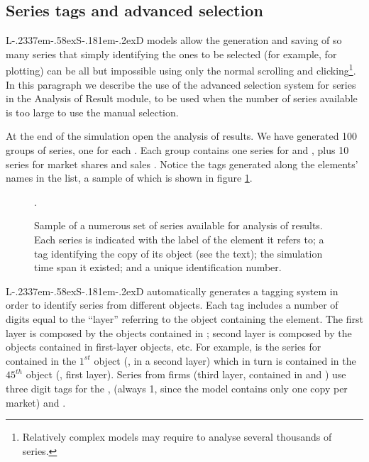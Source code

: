 \documentclass [11pt,a4paper] {book}
\def\LsD{{L\kern-.2337em\lower-.58ex\hbox{S}\kern-.181em\lower-.2ex\hbox{D}}\xspace}
\begin{document}
\subsection{Series tags and advanced selection}

\LsD models allow the generation and saving of so many series that simply identifying the ones to be selected (for example, for plotting) can be all but impossible using only the normal scrolling and clicking\footnote{Relatively complex models may require to analyse several thousands of series.}. In this paragraph we describe the use of the advanced selection system for series in the Analysis of Result module, to be used when the number of series available is too large to use the manual selection.

At the end of the simulation open the analysis of results. We have generated 100 groups of series, one for each . Each group contains one series for  and , plus 10 series for market shares  and sales . Notice the tags generated along the elements' names in the  list, a sample of which is shown in figure \ref{fig:tags}.

\begin{figure}[ht]
  \centering
  \caption{\small Sample of a numerous set of series available for analysis of results. Each series is indicated with the label of the element it refers to; a tag identifying the copy of its object (see the text); the simulation time span it existed; and a unique identification number.}.
   \label{fig:tags}
\end{figure}

\LsD automatically generates a tagging system in order to identify series from different objects. Each tag includes a number of digits equal to the ``layer'' referring to the object containing the element. The first layer is composed by the objects contained in ; second layer is composed by the objects contained in first-layer objects, etc. For example,  is the series for  contained in the $1^{st}$ object (, in a second layer) which in turn is contained in the $45^{th}$ object (, first layer). Series from firms (third layer, contained in  and ) use three digit tags for the ,  (always 1, since the model contains only one copy per market) and .
\end{document}
